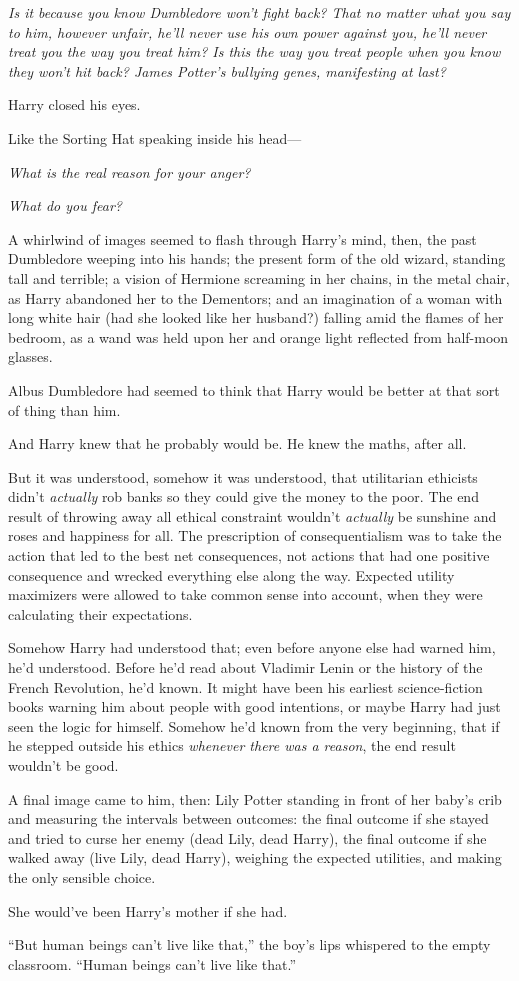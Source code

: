 \emph{Is it because you know Dumbledore won’t fight back? That no matter what you say to him, however unfair, he’ll never use his own power against you, he’ll never treat you the way you treat him? Is this the way you treat people when you know they won’t hit back? James Potter’s bullying genes, manifesting at last?}

Harry closed his eyes.

Like the Sorting Hat speaking inside his head—

\emph{What is the real reason for your anger?}

\emph{What do you fear?}

A whirlwind of images seemed to flash through Harry’s mind, then, the past Dumbledore weeping into his hands; the present form of the old wizard, standing tall and terrible; a vision of Hermione screaming in her chains, in the metal chair, as Harry abandoned her to the Dementors; and an imagination of a woman with long white hair (had she looked like her husband?) falling amid the flames of her bedroom, as a wand was held upon her and orange light reflected from half-moon glasses.

Albus Dumbledore had seemed to think that Harry would be better at that sort of thing than him.

And Harry knew that he probably would be. He knew the maths, after all.

But it was understood, somehow it was understood, that utilitarian ethicists didn’t \emph{actually} rob banks so they could give the money to the poor. The end result of throwing away all ethical constraint wouldn’t \emph{actually} be sunshine and roses and happiness for all. The prescription of consequentialism was to take the action that led to the best net consequences, not actions that had one positive consequence and wrecked everything else along the way. Expected utility maximizers were allowed to take common sense into account, when they were calculating their expectations.

Somehow Harry had understood that; even before anyone else had warned him, he’d understood. Before he’d read about Vladimir Lenin or the history of the French Revolution, he’d known. It might have been his earliest science-fiction books warning him about people with good intentions, or maybe Harry had just seen the logic for himself. Somehow he’d known from the very beginning, that if he stepped outside his ethics \emph{whenever there was a reason}, the end result wouldn’t be good.

A final image came to him, then: Lily Potter standing in front of her baby’s crib and measuring the intervals between outcomes: the final outcome if she stayed and tried to curse her enemy (dead Lily, dead Harry), the final outcome if she walked away (live Lily, dead Harry), weighing the expected utilities, and making the only sensible choice.

She would’ve been Harry’s mother if she had.

“But human beings can’t live like that,” the boy’s lips whispered to the empty classroom.
“Human beings can’t live like that.”

